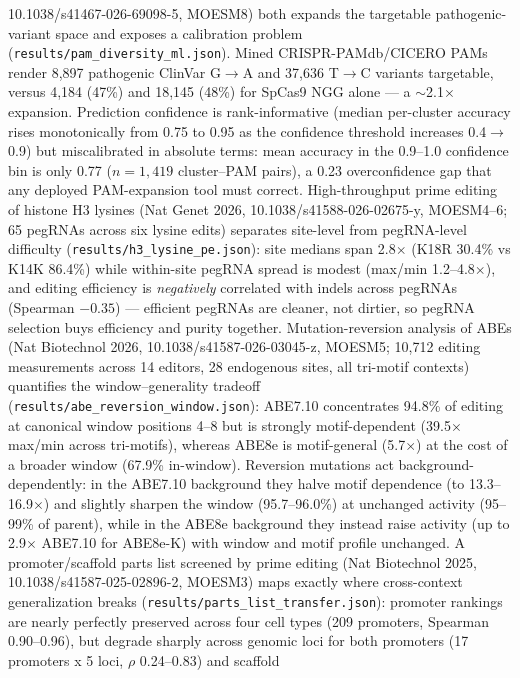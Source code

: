 \documentclass[12pt]{article}
\begin{document}
10.1038/s41467-026-69098-5, MOESM8) both expands the targetable
pathogenic-variant space and exposes a calibration problem
(\texttt{results/pam\_diversity\_ml.json}). Mined CRISPR-PAMdb/CICERO
PAMs render 8,897 pathogenic ClinVar G$\to$A and 37,636 T$\to$C
variants targetable, versus 4,184 (47\%) and 18,145 (48\%) for SpCas9
NGG alone --- a $\sim$2.1$\times$ expansion. Prediction confidence is
rank-informative (median per-cluster accuracy rises monotonically from
0.75 to 0.95 as the confidence threshold increases 0.4$\to$0.9) but
miscalibrated in absolute terms: mean accuracy in the 0.9--1.0
confidence bin is only 0.77 ($n=1{,}419$ cluster--PAM pairs), a 0.23
overconfidence gap that any deployed PAM-expansion tool must correct.
High-throughput prime editing of histone H3 lysines (Nat Genet 2026,
10.1038/s41588-026-02675-y, MOESM4--6; 65 pegRNAs across six lysine
edits) separates site-level from pegRNA-level difficulty
(\texttt{results/h3\_lysine\_pe.json}): site medians span 2.8$\times$
(K18R 30.4\% vs K14K 86.4\%) while within-site pegRNA spread is modest
(max/min 1.2--4.8$\times$), and editing efficiency is
\emph{negatively} correlated with indels across pegRNAs (Spearman
$-0.35$) --- efficient pegRNAs are cleaner, not dirtier, so pegRNA
selection buys efficiency and purity together.
Mutation-reversion analysis of ABEs (Nat Biotechnol 2026,
10.1038/s41587-026-03045-z, MOESM5; 10,712 editing measurements across
14 editors, 28 endogenous sites, all tri-motif contexts) quantifies the
window--generality tradeoff (\texttt{results/abe\_reversion\_window.json}):
ABE7.10 concentrates 94.8\% of editing at canonical window positions
4--8 but is strongly motif-dependent (39.5$\times$ max/min across
tri-motifs), whereas ABE8e is motif-general (5.7$\times$) at the cost
of a broader window (67.9\% in-window). Reversion mutations act
background-dependently: in the ABE7.10 background they halve motif
dependence (to 13.3--16.9$\times$) and slightly sharpen the window
(95.7--96.0\%) at unchanged activity (95--99\% of parent), while in
the ABE8e background they instead raise activity (up to 2.9$\times$
ABE7.10 for ABE8e-K) with window and motif profile unchanged.
A promoter/scaffold parts list screened by prime editing (Nat Biotechnol
2025, 10.1038/s41587-025-02896-2, MOESM3) maps exactly where
cross-context generalization breaks
(\texttt{results/parts\_list\_transfer.json}): promoter rankings are
nearly perfectly preserved across four cell types (209 promoters,
Spearman 0.90--0.96), but degrade sharply across genomic loci for both
promoters (17 promoters x 5 loci, $\rho$ 0.24--0.83) and scaffold
\end{document}
